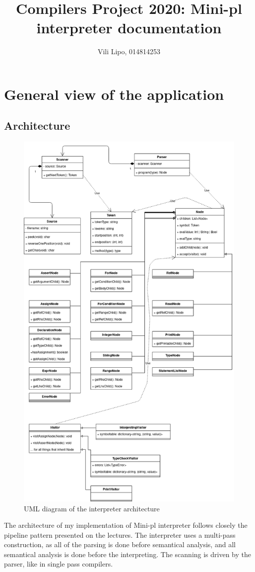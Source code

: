 \documentclass[12pt,a4paper]{article}
\author{Vili Lipo, 014814253}
\title{Compilers Project 2020: Mini-pl interpreter documentation}
\begin{document}
\maketitle
\newpage

\section{General view of the application}
\subsection{Architecture}

\begin{figure}[t]\label{big_uml}
  \caption{UML diagram of the interpreter architecture}
  \includegraphics[scale=0.4]{reportImages/interpreter.png}
\end{figure}
The architecture of my implementation of Mini-pl interpreter
follows closely the pipeline pattern presented on the lectures.
The interpreter uses a multi-pass construction, as all of the
parsing is done before semantical analysis, and all semantical
analysis is done before the interpreting. The scanning
is driven by the parser, like in single pass compilers.
\end{document}
